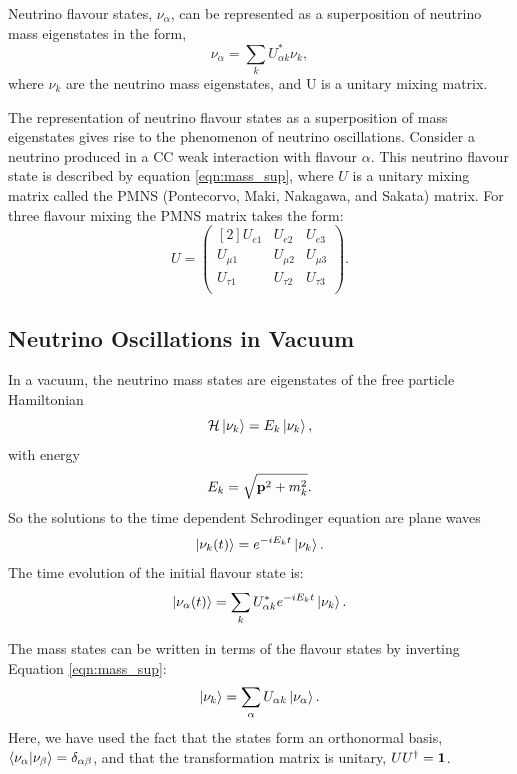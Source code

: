 Neutrino flavour states, $\nu_\alpha$, can be represented as a superposition of 
neutrino mass eigenstates in the form,
\begin{equation}
	\label{eqn:mass_sup}
	\nu_\alpha = \sum_{k} U^*_{\alpha k} \nu_k,
\end{equation}
where $\nu_k$ are the neutrino mass eigenstates, and U is a unitary mixing
matrix. 

The representation of neutrino flavour states as a superposition of mass 
eigenstates gives rise to the phenomenon of neutrino oscillations. Consider a 
neutrino produced in a CC weak interaction with flavour \(\alpha\). 
This neutrino flavour state is described by equation \ref{eqn:mass_sup},
where \(U\) is a unitary mixing matrix called the PMNS 
(Pontecorvo, Maki, Nakagawa, and Sakata) matrix. For three flavour mixing the 
PMNS matrix takes the form:
\begin{equation*}
	U = 
	\begin{pmatrix}[2]
		U_{e1} & U_{e2} & U_{e3} \\
		U_{\mu1} & U_{\mu2} & U_{\mu3} \\
		U_{\tau1} & U_{\tau2} & U_{\tau3} \\
	\end{pmatrix}.
\end{equation*}

\subsection{Neutrino Oscillations in Vacuum}
In a vacuum, the neutrino mass states are eigenstates of the free particle Hamiltonian
\begin{equation*}
	{\cal H} \ket{\nu_k} = E_k \ket{\nu_k},
\end{equation*}
with energy
\begin{equation*}
	E_k = \sqrt{\vb{p}^2 + m_k^2}.
\end{equation*}
So the solutions to the time dependent Schrodinger equation are plane waves
\begin{equation*}
	\ket{\nu_k(t)} = e^{-iE_kt}\ket{\nu_k}.
\end{equation*}
The time evolution of the initial flavour state is:
\begin{equation}
	\label{eqn:flavour_time_mass}
	\ket{\nu_\alpha(t)} = \sum_k U_{\alpha k}^* e^{-iE_kt} \ket{\nu_k}.
\end{equation}

The mass states can be written in terms of the flavour states by inverting
Equation \ref{eqn:mass_sup}:
\begin{equation}
	\label{eqn:flav_sup}
	\ket{\nu_k} = \sum_\alpha U_{\alpha k} \ket{\nu_\alpha}.
\end{equation}
Here, we have used the fact that the states form an orthonormal basis,
\(\braket{\nu_\alpha}{\nu_\beta} = \delta_{\alpha \beta}\), and that the 
transformation matrix is unitary, \(UU^\dagger = \vb{1}\).

